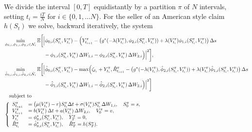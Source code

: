 \documentclass{article}
\newcommand{\E}{\mathbb{E}}
\begin{document}
We divide the interval $[0,T]$ equidistantly by a partition $\pi$ of $N$ intervals, setting $t_i = \frac{iT}{N}$ for $i \in \{0, 1, \ldots N\}$. For the seller of an American style claim $h(S_t)$ we solve, backward iteratively, the system
\begin{align*}
	&\min_{\phi_{0,i}, \phi_{1,i}, \phi_{2,i} \in \mathcal{N}_i} \E\biggl[\Bigl\vert \phi_{0,i}(S^\pi_{t_i}, V^\pi_{t_i}) - \Bigl(Y^\pi_{t_{i+1}} - \bigl(g^*(-
	\lambda(V^\pi_{t_i}),  \phi_{2,i}(S^\pi_{t_i}, V^\pi_{t_i})) + \lambda(V^\pi_{t_i})\phi_{1,i}(S^\pi_{t_i}, V^\pi_{t_i})\bigr)  \, \Delta s \\ 
	&\phantom{==========}- \phi_{1,i}(S^\pi_{t_i}, V^\pi_{t_i}) \, \Delta W_{1,i} - \phi_{2,i}(S^\pi_{t_i}, V^\pi_{t_i}) \, \Delta W_{2,i}\Bigr)\Bigr\vert^2\biggr],\\
	&\min_{\hat{\phi}_{0,i}, \hat{\phi}_{1,i}, \hat{\phi}_{2,i} \in \hat{\mathcal{N}}_i} \E\biggl[\Bigl\vert \hat{\phi}_{0,i}(S^\pi_{t_i}, V^\pi_{t_i}) -
	\max\Bigl(\zeta_{t_i} + Y^\pi_{t_i}, \hat{R}^\pi_{t_{i+1}} - \bigl(g^*(-\lambda(V^\pi_{t_i}), \hat{\phi}_{2,i}(S^\pi_{t_i}, V^\pi_{t_i})) +
	\lambda(V^\pi_{t_i})\hat{\phi}_{1,i}(S^\pi_{t_i}, V^\pi_{t_i})\bigr)  \, \Delta s \\
	&\phantom{==========}- \hat{\phi}_{1,i}(S^\pi_{t_i}, V^\pi_{t_i}) \, \Delta W_{1,i} - \hat{\phi}_{2,i}(S^\pi_{t_i}, V^\pi_{t_i}) \, \Delta W_{2,i}\Bigr)
	\Bigr\vert^2\biggr]\\& \quad \text{subject to}\\
	&\left\{\begin{array}{ll}
		S^\pi_{t_{i+1}}  &= \bigl(\mu(V^\pi_{t_i}) -r \bigr)S^\pi_{t_i} \Delta t+\sigma(V^\pi_{t_i}) S^\pi_{t_i}\, \Delta W_{1,i}, \quad S^\pi_0 = s,\\
		V^\pi_{t_{i+1}} &= b(V^\pi_{t_i}) \, \Delta t +a(V^\pi_{t_i}) \, \Delta W_{2,i}, \quad V^\pi_0 = v,\\
		Y^\pi_{t_i} & = \phi^*_{0,i}(S^\pi_{t_i}, V^\pi_{t_i}), \quad Y^\pi_T =  0,\\
		\hat{R}^\pi_{t_i} & =  \hat{\phi}^*_{0,i}(S^\pi_{t_i}, V^\pi_{t_i}),  \quad \hat{R}^\pi_T =  h(S^\pi_T).
	\end{array} \right.
\end{align*}
\end{document}
